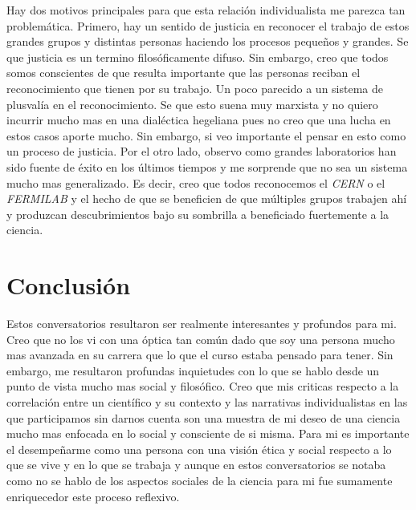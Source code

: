 \documentclass[12pt]{exam}
\begin{document}
Hay dos motivos principales para que esta relación individualista me parezca tan problemática. Primero, hay un sentido de justicia en reconocer el trabajo de estos grandes grupos y distintas personas haciendo los procesos pequeños y grandes. Se que justicia es un termino filosóficamente difuso. Sin embargo, creo que todos somos conscientes de que resulta importante que las personas reciban el reconocimiento que tienen por su trabajo. Un poco parecido a un sistema de plusvalía en el reconocimiento. Se que esto suena muy marxista y no quiero incurrir mucho mas en una dialéctica hegeliana pues no creo que una lucha en estos casos aporte mucho. Sin embargo, si veo importante el pensar en esto como un proceso de justicia. Por el otro lado, observo como grandes laboratorios han sido fuente de éxito en los últimos tiempos y me sorprende que no sea un sistema mucho mas generalizado. Es decir, creo que todos reconocemos el \textit{CERN} o el \textit{FERMILAB} y el hecho de que se beneficien de que múltiples grupos trabajen ahí y produzcan descubrimientos bajo su sombrilla a beneficiado fuertemente a la ciencia.

\section*{Conclusión}

Estos conversatorios resultaron ser realmente interesantes y profundos para mi. Creo que no los vi con una óptica tan común dado que soy una persona mucho mas avanzada en su carrera que lo que el curso estaba pensado para tener. Sin embargo, me resultaron profundas inquietudes con lo que se hablo desde un punto de vista mucho mas social y filosófico. Creo que mis criticas respecto a la correlación entre un científico y su contexto y las narrativas individualistas en las que participamos sin darnos cuenta son una muestra de mi deseo de una ciencia mucho mas enfocada en lo social y consciente de si misma. Para mi es importante el desempeñarme como una persona con una visión ética y social respecto a lo que se vive y en lo que se trabaja y aunque en estos conversatorios se notaba como no se hablo de los aspectos sociales de la ciencia para mi fue sumamente enriquecedor este proceso reflexivo.
\end{document}
